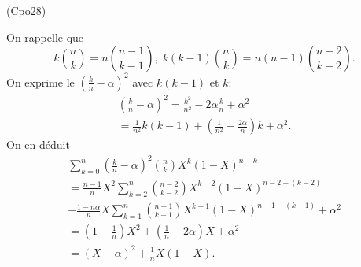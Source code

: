 \begin{tiny}(Cpo28)\end{tiny} On rappelle que
\[
  k\binom{n}{k} = n\binom{n-1}{k-1},\; k(k-1)\binom{n}{k} = n(n-1)\binom{n-2}{k-2}. 
\]
On exprime le $\left(\frac{k}{n}-\alpha\right)^2$ avec $k(k-1)$ et $k$:
\begin{multline*}
\left(\frac{k}{n}-\alpha\right)^2
= \frac{k^2}{n^2} - 2\alpha \frac{k}{n} + \alpha^2 \\
=\frac{1}{n^2}k(k-1) + \left(\frac{1}{n^2} - \frac{2\alpha}{n} \right)k + \alpha^2.
\end{multline*}
On en déduit
\begin{multline*}
\sum_{k=0}^n \left( \frac{k}{n}-\alpha \right)^2\binom{n}{k}X^k(1-X)^{n-k}\\
= \frac{n-1}{n}X^2\sum_{k=2}^n \binom{n-2}{k-2}X^{k-2}(1-X)^{n-2-(k-2)}\\
+ \frac{1-n\alpha}{n} X \sum_{k=1}^n \binom{n-1}{k-1}X^{k-1}(1-X)^{n-1-(k-1)} + \alpha^2 \\
= (1-\frac{1}{n}) X^2 + (\frac{1}{n}-2\alpha) X + \alpha^2 \\
= (X-\alpha)^2 + \frac{1}{n}X(1-X).
\end{multline*}
